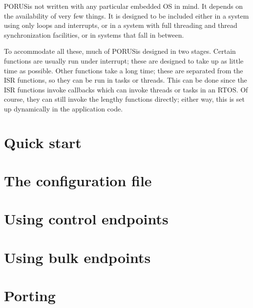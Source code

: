 \documentclass[10pt]{article}
\newcommand{\porus}{PORUS}
\begin{document}
\porus is not written with any particular embedded OS in mind.  It depends on the availability of very few things.  It is designed to be included either in a system using only loops and interrupts, or in a system with full threading and thread synchronization facilities, or in systems that fall in between.

To accommodate all these, much of \porus is designed in two stages.  Certain functions are usually run under interrupt; these are designed to take up as little time as possible.  Other functions take a long time; these are separated from the ISR functions, so they can be run in tasks or threads.  This can be done since the ISR functions invoke callbacks which can invoke threads or tasks in an RTOS.  Of course, they can still invoke the lengthy functions directly; either way, this is set up dynamically in the application code.

\section{Quick start}

\section{The configuration file}

\section{Using control endpoints}

\section{Using bulk endpoints}

\section{Porting}
\end{document}
